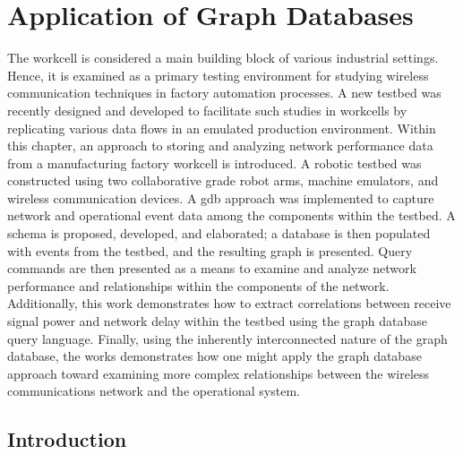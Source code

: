 
\chapter{Application of Graph Databases}\label{chapter:graphdb}

\chapterintro*

The workcell is considered a main building block of various industrial settings. Hence, it is examined as a primary testing environment for studying wireless communication techniques in factory automation processes. A new testbed was recently designed and developed to facilitate such studies in workcells by replicating various data flows in an emulated production environment. Within this chapter, an approach to storing and analyzing network performance data from a manufacturing factory workcell is introduced.  A robotic testbed was constructed using two collaborative grade robot arms, machine emulators, and wireless communication devices. A \gls{gdb} approach was implemented to capture network and operational event data among the components within the testbed.  A schema is proposed, developed, and elaborated; a database is then populated with events from the testbed, and the resulting graph is presented. Query commands are then presented as a means to examine and analyze network performance and relationships within the components of the network.  Additionally, this work demonstrates how to extract correlations between receive signal power and network delay within the testbed using the graph database query language.  Finally, using the inherently interconnected nature of the graph database, the works demonstrates how one might apply the graph database approach toward examining more complex relationships between the wireless communications network and the operational system.

\section{Introduction} \label{gdbappl:sec::intro}

